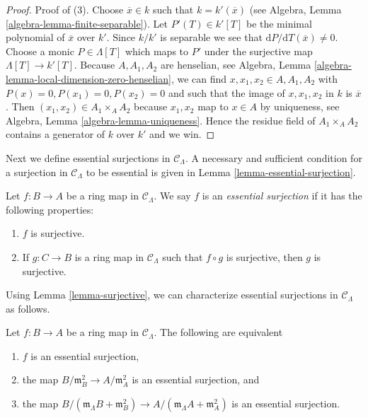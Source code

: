 \begin{proof}
\medskip\noindent
Proof of (3). Choose $\overline{x} \in k$ such that
$k = k'(\overline{x})$ (see
Algebra, Lemma \ref{algebra-lemma-finite-separable}).
Let $P'(T) \in k'[T]$ be the minimal polynomial of $\overline{x}$ over $k'$.
Since $k/k'$ is separable we see that
$\text{d}P/\text{d}T(\overline{x}) \not = 0$.
Choose a monic $P \in \Lambda[T]$ which maps to $P'$ under the surjective map
$\Lambda[T] \to k'[T]$. Because $A, A_1, A_2$ are henselian, see
Algebra, Lemma \ref{algebra-lemma-local-dimension-zero-henselian},
we can find $x, x_1, x_2 \in A, A_1, A_2$ with $P(x) = 0, P(x_1) = 0,
P(x_2) = 0$ and such that the image of $x, x_1, x_2$ in $k$ is $\overline{x}$.
Then $(x_1, x_2) \in A_1 \times_A A_2$ because $x_1, x_2$
map to $x \in A$ by uniqueness, see
Algebra, Lemma \ref{algebra-lemma-uniqueness}.
Hence the residue field of
$A_1 \times_A A_2$ contains a generator of $k$ over $k'$ and we win.
\end{proof}

\noindent
Next we define essential surjections in $\mathcal{C}_\Lambda$. A necessary 
and sufficient condition for a surjection in $\mathcal{C}_\Lambda$ to be 
essential is given in Lemma \ref{lemma-essential-surjection}.

\begin{definition}
\label{definition-essential-surjection}
Let $f: B \to A$ be a ring map in $\mathcal{C}_\Lambda$.  We say $f$ 
is an {\it essential surjection} if it has the following properties:
\begin{enumerate}
\item $f$ is surjective.
\item If $g: C \to B$ is a ring map in $\mathcal{C}_\Lambda$ such that 
$f \circ g$ is surjective, then $g$ is surjective.
\end{enumerate}
\end{definition}

\noindent
Using Lemma \ref{lemma-surjective}, we can characterize
essential surjections in $\mathcal{C}_\Lambda$ as follows.

\begin{lemma}
\label{lemma-essential-surjection-mod-squares}
Let $f: B \to A$ be a ring map in $\mathcal{C}_\Lambda$.
The following are equivalent
\begin{enumerate}
\item $f$ is an essential surjection,
\item the map $B/\mathfrak m_B^2 \to A/\mathfrak m_A^2$ is an essential
surjection, and
\item the map
$B/(\mathfrak m_\Lambda B + \mathfrak m_B^2) \to
A/(\mathfrak m_\Lambda A + \mathfrak m_A^2)$ is an essential surjection.
\end{enumerate}
\end{lemma}

